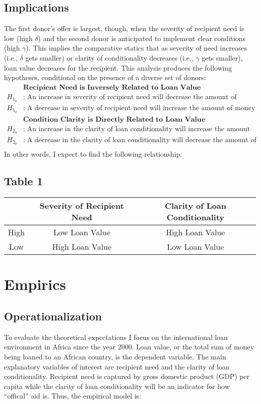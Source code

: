\subsection*{Implications}
The first donor's offer is largest, though, when the severity of recipient need is low (high $\delta$) and the second donor is anticipated to implement clear conditions (high $\gamma$). This implies the comparative statics that as severity of need increases (i.e., $\delta$ gets smaller) or clarity of conditionality decreases (i.e., $\gamma$ gets smaller), loan value decreases for the recipient. This analysis produces the following hypotheses, conditional on the presence of a diverse set of donors:
\begin{align*}
    &\textbf{Recipient Need is Inversely Related to Loan Value}\\
    H_{1_a}&:\;\text{An increase in severity of recipient need will decrease the amount of money offered via loans}\\
    H_{1_b}&:\;\text{A decrease in severity of recipient need will increase the amount of money offered via loans}\\
    &\textbf{Condition Clarity is Directly Related to Loan Value}\\
    H_{2_a}&:\;\text{An increase in the clarity of loan conditionality will increase the amount of money offered via loans}\\
    H_{2_b}&:\;\text{A decrease in the clarity of loan conditionality will decrease the amount of money offered via loans}\\
\end{align*}
In other words, I expect to find the following relationship:

\subsection*{Table 1}
\begin{tabular}{c|c c }
    & Severity of Recipient Need & Clarity of Loan Conditionality\\
    \hline
    High & Low Loan Value & High Loan Value\\
    Low & High Loan Value & Low Loan Value\\
\end{tabular}

\section*{Empirics}
\subsection*{Operationalization}
To evaluate the theoretical expectations I focus on the international loan environment in Africa since the year 2000. Loan value, or the total sum of money being loaned to an African country, is the dependent variable. The main explanatory variables of interest are recipient need and the clarity of loan conditionality. Recipient need is captured by gross domestic product (GDP) per capita while the clarity of loan conditionality will be an indicator for how ``offical'' aid is. Thus, the empirical model is:


